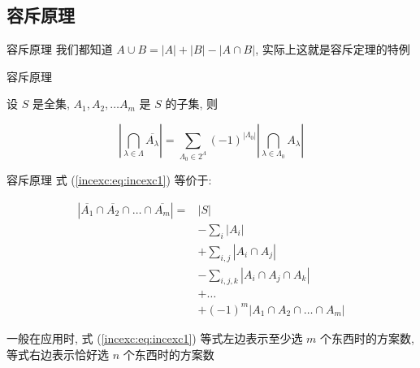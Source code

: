 \subsection*{容斥原理}


\begin{frame}{容斥原理}
	我们都知道 \(A\cup B=|A|+|B|-|A\cap B|\), 实际上这就是容斥定理的特例
\end{frame}


\begin{frame}[fragile]{容斥原理}
	\begin{theorem}[容斥原理]
		\label{incexc:th:incexc}

		设 \(S\) 是全集, \(A_1,A_2,\dots A_m\) 是 \(S\) 的子集, 则

		\begin{equation}
			\label{incexc:eq:incexc1}
			\left|\bigcap_{\lambda\in\Lambda}\overline{A_{\lambda}}\right|=\sum_{\Lambda_0\in 2^{\Lambda}}(-1)^{|\Lambda_0|}\left|\bigcap_{\lambda\in\Lambda_0}A_{\lambda}\right|
		\end{equation}
	\end{theorem}
\end{frame}


\begin{frame}{容斥原理}
	式 (\ref{incexc:eq:incexc1}) 等价于:

	\begin{equation}
		\label{incexc:eq:incexc2}
		\begin{aligned}
			\left|\overline{A_1}\cap\overline{A_2}\cap\dots\cap\overline{A_m}\right| = & |S|                                   \\
			                                                                           & -\sum_{i}|A_i|                        \\
			                                                                           & +\sum_{i,j}|A_i\cap A_j|              \\
			                                                                           & -\sum_{i,j,k}|A_i\cap A_j\cap A_k|    \\
			                                                                           & +\dots                                \\
			                                                                           & +(-1)^m|A_1\cap A_2\cap\dots\cap A_m|
		\end{aligned}
	\end{equation}

	\pause
	一般在应用时, 式 (\ref{incexc:eq:incexc1}) 等式左边表示至少选 \(m\) 个东西时的方案数, 等式右边表示恰好选 \(n\) 个东西时的方案数
\end{frame}
